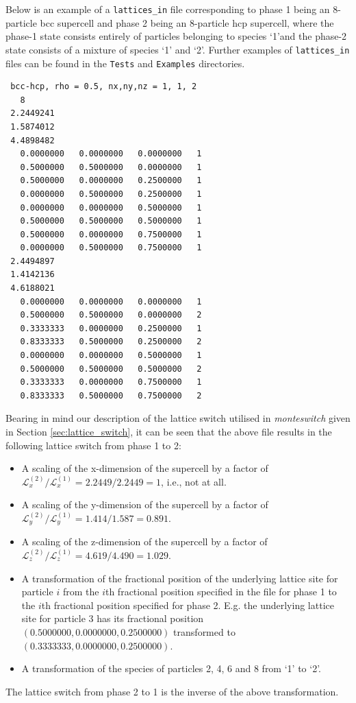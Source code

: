 \documentclass{report}
\begin{document}
Below is an example of a \texttt{lattices\_in} file corresponding to phase 1 being an 8-particle bcc supercell and phase 2 being an 8-particle hcp 
supercell, where the phase-1 state consists entirely of particles belonging to species `1'and the phase-2 state consists of a mixture of species `1'
and `2'. Further examples of \texttt{lattices\_in} files can be found in the \texttt{Tests} and \texttt{Examples} directories.
\begin{verbatim}
 bcc-hcp, rho = 0.5, nx,ny,nz = 1, 1, 2
   8
 2.2449241     
 1.5874012     
 4.4898482
   0.0000000   0.0000000   0.0000000   1
   0.5000000   0.5000000   0.0000000   1
   0.5000000   0.0000000   0.2500000   1
   0.0000000   0.5000000   0.2500000   1
   0.0000000   0.0000000   0.5000000   1
   0.5000000   0.5000000   0.5000000   1
   0.5000000   0.0000000   0.7500000   1
   0.0000000   0.5000000   0.7500000   1
 2.4494897     
 1.4142136     
 4.6188021     
   0.0000000   0.0000000   0.0000000   1
   0.5000000   0.5000000   0.0000000   2
   0.3333333   0.0000000   0.2500000   1
   0.8333333   0.5000000   0.2500000   2
   0.0000000   0.0000000   0.5000000   1
   0.5000000   0.5000000   0.5000000   2
   0.3333333   0.0000000   0.7500000   1
   0.8333333   0.5000000   0.7500000   2
\end{verbatim}
Bearing in mind our description of the lattice switch utilised in \emph{monteswitch} given in Section \ref{sec:lattice_switch}, it can be seen that
the above file results in the following lattice switch from phase 1 to 2:
\begin{itemize}
\item A scaling of the x-dimension of the supercell by a factor of $\mathcal{L}_x^{(2)}/\mathcal{L}_x^{(1)}=2.2449/2.2449=1$, i.e., not at all.
\item A scaling of the y-dimension of the supercell by a factor of $\mathcal{L}_y^{(2)}/\mathcal{L}_y^{(1)}=1.414/1.587=0.891$.
\item A scaling of the z-dimension of the supercell by a factor of $\mathcal{L}_z^{(2)}/\mathcal{L}_z^{(1)}=4.619/4.490=1.029$.
\item A transformation of the fractional position of the underlying lattice site for particle $i$ from the $i$th fractional position specified in the file
for phase 1 to the $i$th fractional position specified for phase 2. E.g. the underlying lattice site for particle 3 has its fractional position
$(0.5000000,0.0000000,0.2500000)$ transformed to $(0.3333333,0.0000000,0.2500000)$.
\item A transformation of the species of particles 2, 4, 6 and 8 from `1' to `2'.
\end{itemize}
The lattice switch from phase 2 to 1 is the inverse of the above transformation.
\end{document}
